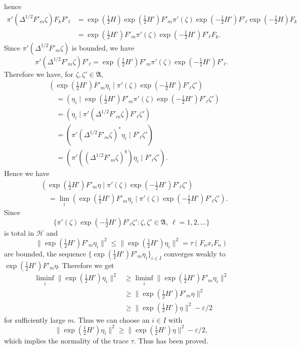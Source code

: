 \documentclass[12pt,b5paper,twoside]{article}
\theoremstyle{takesaki}
\numberwithin{equation}{section}
\begin{document}
hence
\begin{align*}
 \pi'(\Delta^{1/2}F'_m\zeta)F_kF'_\ell
 &=\exp(\tfrac12H)\exp(\tfrac12H')F'_m\pi'(\zeta)
   \exp(-\tfrac12H')F'_\ell\exp(-\tfrac12H)F_k\\
 &=\exp(\tfrac12H')F'_m\pi'(\zeta)
   \exp(-\tfrac12H')F'_\ell F_k.
\end{align*}
Since $\pi'(\Delta^{1/2}F'_m\zeta)$ is bounded, we have
\[
 \pi'(\Delta^{1/2}F'_m\zeta)F'_\ell
 =\exp(\tfrac12H')F'_m\pi'(\zeta)
   \exp(-\tfrac12H')F'_\ell.
\]
Therefore we have, for $\zeta,\zeta'\in\mathfrak A$,
\begin{align*}
 &(\exp(\tfrac12H')F'_m\eta_i
   \mid\pi'(\zeta)\exp(-\tfrac12H')F'_\ell\zeta')\\
 &\quad=(\eta_i\mid
   \exp(\tfrac12H')F'_m\pi'(\zeta)
   \exp(-\tfrac12H')F'_\ell\zeta')\\
 &\quad=(\eta_i\mid
   \pi'(\Delta^{1/2}F'_m\zeta)F'_\ell\zeta')\\
 &\quad=(\pi'(\Delta^{1/2}F'_m\zeta)^*\eta_i\mid F'_\ell\zeta')\\
 &\quad=(\pi'((\Delta^{1/2}F'_m\zeta)^b)\eta_i\mid F'_\ell\zeta').
\end{align*}
Hence we have
\begin{align*}
 &(\exp(\tfrac12H')F'_m\eta
    \mid\pi'(\zeta)\exp(-\tfrac12H')F'_\ell\zeta')\\
 &\quad=\lim_i
   (\exp(\tfrac12H')F'_m\eta_i
    \mid\pi'(\zeta)\exp(-\tfrac12H')F'_\ell\zeta').
\end{align*}
Since
\[
 \{\pi'(\zeta)\exp(-\tfrac12H')F'_\ell\zeta':
   \zeta,\zeta'\in\mathfrak A,\ \ell=1,2,\ldots\}
\]
is total in $\mathcal H$ and
\[
 \|\exp(\tfrac12H')F'_m\eta_i\|^2
 \leq\|\exp(\tfrac12H')\eta_i\|^2
 =\tau(F_nx_iF_n)
\]
are bounded, the sequence
$\{\exp(\tfrac12H')F'_m\eta_i\}_{i\in I}$ converges weakly to
$\exp(\tfrac12H')F'_m\eta$.  Therefore we get
\begin{align*}
 \liminf_i\|\exp(\tfrac12H')\eta_i\|^2
 &\geq\liminf_i\|\exp(\tfrac12H')F'_m\eta_i\|^2\\
 &\geq\|\exp(\tfrac12H')F'_m\eta\|^2\\
 &\geq\|\exp(\tfrac12H')\eta\|^2-\varepsilon/2
\end{align*}
for sufficiently large $m$.  Thus we can choose an $i\in I$ with
\[
 \|\exp(\tfrac12H')\eta_i\|^2
 \geq\|\exp(\tfrac12H')\eta\|^2-\varepsilon/2,
\]
which implies the normality of the trace $\tau$.  Thus
 has been proved.
\end{document}

